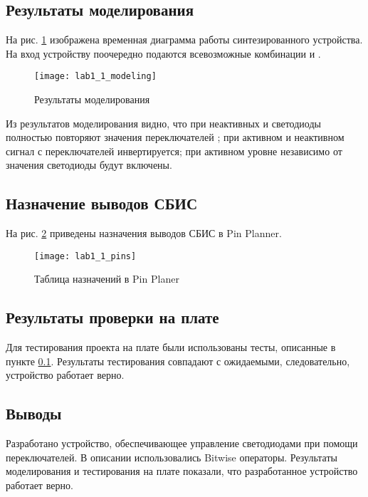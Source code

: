 \subsection{Результаты моделирования}
\label{sec:lab1_1_modeling}

На рис. \ref{fig:lab1_1_modeling} изображена временная диаграмма работы синтезированного устройства. На вход устройству поочередно подаются всевозможные комбинации  и .
\begin{figure}[H]
\begin{center}
	\texttt{[image: lab1\_1\_modeling]}
	\caption{Результаты моделирования}
	\label{fig:lab1_1_modeling}
\end{center}
\end{figure}
Из результатов моделирования видно, что при неактивных  и  светодиоды  полностью повторяют значения переключателей ; при активном  и неактивном  сигнал с переключателей инвертируется; при активном уровне  независимо от значения  светодиоды будут включены.

\subsection{Назначение выводов СБИС}

На рис. \ref{fig:lab1_1_pins} приведены назначения выводов СБИС в Pin Planner.

\begin{figure}[H]
\begin{center}
	\texttt{[image: lab1\_1\_pins]}
	\caption{Таблица назначений в Pin Planer}
	\label{fig:lab1_1_pins}
\end{center}
\end{figure}

\subsection{Результаты проверки на плате}

Для тестирования проекта на плате были использованы тесты, описанные в пункте \ref{sec:lab1_1_modeling}. Результаты тестирования совпадают с ожидаемыми, следовательно, устройство работает верно.

\subsection{Выводы}

Разработано устройство, обеспечивающее управление светодиодами при помощи переключателей. В описании использовались Bitwise операторы. Результаты моделирования и тестирования на плате показали, что разработанное устройство работает верно.


